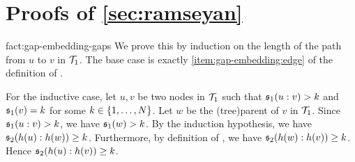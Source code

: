 \clearpage 
\section{Proofs of \cref{sec:ramseyan}}


\begin{proofof}{fact:gap-embedding-gaps}
  We prove this by induction on the length of the path 
  from $u$ to $v$ in $\t_1$. The base case is exactly 
  \cref{item:gap-embedding:edge} of the definition of .

  For the inductive case, let $u, v$ be two nodes in $\t_1$
  such that $\mathfrak{s}_1(u:v) > k$ and $\mathfrak{s}_1(v) = k$ for some $k \in \{ 1, \dots, N \}$.
  Let $w$ be the \kl(tree){parent} of $v$ in $\t_1$.
  Since $\mathfrak{s}_1(u:v) > k$, we have $\mathfrak{s}_1(w) > k$.
  By the induction hypothesis, we have $\mathfrak{s}_2(h(u):h(w)) \geq k$.
  Furthermore, by definition of , we have $\mathfrak{s}_2(h(w):h(v)) \geq k$.
  Hence $\mathfrak{s}_2(h(u):h(v)) \geq k$.
\end{proofof}

